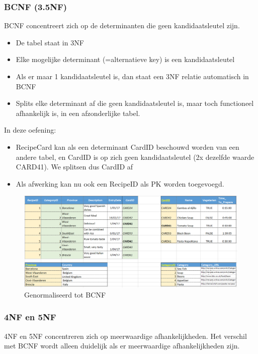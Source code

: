 \documentclass{article}
\begin{document}
\subsubsection{BCNF (3.5NF)}
BCNF concentreert zich op de determinanten die geen kandidaatsleutel zijn.
\begin{itemize}
    \item De tabel staat in 3NF
    \item Elke mogelijke determinant (=alternatieve key) is een kandidaatsleutel
    \item Als er maar 1 kandidaatsleutel is, dan staat een 3NF relatie automatisch in BCNF
    \item Splits elke determinant af die geen kandidaatsleutel is, maar toch functioneel afhankelijk is, in een afzonderlijke tabel.
\end{itemize}

In deze oefening:

\begin{itemize}
    \item RecipeCard kan als een determinant CardID beschouwd worden van een andere tabel, 
    en CardID is op zich geen kandidaatsleutel (2x dezelfde waarde CARD41). We splitsen dus CardID af
    \item Als afwerking kan nu ook een RecipeID als PK worden toegevoegd.
\end{itemize}

\begin{figure}[H]
    \centering
    \includegraphics[width=\textwidth]{BCNF.png}
    \caption{Genormaliseerd tot BCNF}
\end{figure}

\subsubsection{4NF en 5NF}
4NF en 5NF concentreren zich op meerwaardige afhankelijkheden. Het verschil met BCNF 
wordt alleen duidelijk als er meerwaardige afhankelijkheden zijn. 
\end{document}
